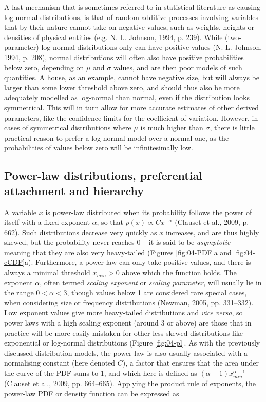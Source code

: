 \documentclass[
  12pt,
]{book}
\begin{document}
A last mechanism that is sometimes referred to in statistical literature as causing log-normal distributions, is that of random additive processes involving variables that by their nature cannot take on negative values, such as weights, heights or densities of physical entities (e.g. N. L. Johnson, 1994, p. 239). While (two-parameter) log-normal distributions only can have positive values (N. L. Johnson, 1994, p. 208), normal distributions will often also have positive probabilities below zero, depending on \(\mu\) and \(\sigma\) values, and are then poor models of such quantities. A house, as an example, cannot have negative size, but will always be larger than some lower threshold above zero, and should thus also be more adequately modelled as log-normal than normal, even if the distribution looks symmetrical. This will in turn allow for more accurate estimates of other derived parameters, like the confidence limits for the coefficient of variation. However, in cases of symmetrical distributions where \(\mu\) is much higher than \(\sigma\), there is little practical reason to prefer a log-normal model over a normal one, as the probabilities of values below zero will be infinitesimally low.

\FloatBarrier

\hypertarget{power-law}{%
\subsection{Power-law distributions, preferential attachment and hierarchy}\label{power-law}}

A variable \(x\) is power-law distributed when its probability follows the power of itself with a fixed exponent \(\alpha\), so that \(p(x) \propto Cx^{-\alpha}\) (Clauset et al., 2009, p. 662). Such distributions decrease very quickly as \(x\) increases, and are thus highly skewed, but the probability never reaches 0 -- it is said to be \emph{asymptotic} -- meaning that they are also very heavy-tailed (Figures \ref{fig:04-PDF}a and \ref{fig:04-cCDF}a). Furthermore, a power law can only take positive values, and there is always a minimal threshold \(x_{min} > 0\) above which the function holds. The exponent \(\alpha\), often termed \emph{scaling exponent} or \emph{scaling parameter}, will usually lie in the range \(0 < \alpha < 3\), though values below 1 are considered rare special cases, when considering size or frequency distributions (Newman, 2005, pp. 331--332). Low exponent values give more heavy-tailed distributions and \emph{vice versa}, so power laws with a high scaling exponent (around 3 or above) are those that in practice will be more easily mistaken for other less skewed distributions like exponential or log-normal distributions (Figure \ref{fig:04-pl}. As with the previously discussed distribution models, the power law is also usually associated with a normalising constant (here denoted \(C\)), a factor that ensures that the area under the curve of the PDF sums to 1, and which here is defined as \((\alpha-1)x_{min}^{\alpha-1}\) (Clauset et al., 2009, pp. 664--665). Applying the product rule of exponents, the power-law PDF or density function can be expressed as
\end{document}
